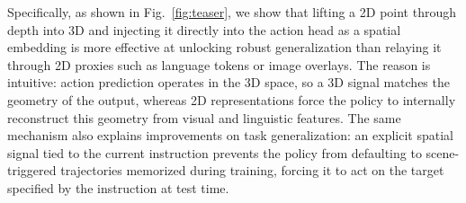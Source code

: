 
Specifically, as shown in Fig.~\ref{fig:teaser}, we show that lifting a 2D point through depth into 3D and injecting it directly into the action head as a spatial embedding is more effective at unlocking robust generalization than relaying it through 2D proxies such as language tokens or image overlays. 
The reason is intuitive: action prediction operates in the 3D space, so a 3D signal matches the geometry of the output, whereas 2D representations force the policy to internally reconstruct this geometry from visual and linguistic features. The same mechanism also explains improvements on task generalization: an explicit spatial signal tied to the current instruction prevents the policy from defaulting to scene-triggered trajectories memorized during training, forcing it to act on the target specified by the instruction at test time.



